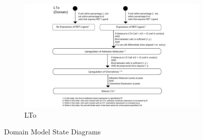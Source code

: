 \documentclass{UoYCSproject}
\begin{document}
\begin{figure}[htp]\ContinuedFloat
\centering
\begin{subfigure}{0.95\textwidth}
\centering
\includegraphics[width=\textwidth]{Appendix/Models/Domain/LTo}
\caption{LTo}
\end{subfigure}

\caption{Domain Model State Diagrams \cite{kieran_thesis, kieran_methodology}}
\label{fig:domain_state_diagrams}
\end{figure}
\end{document}
